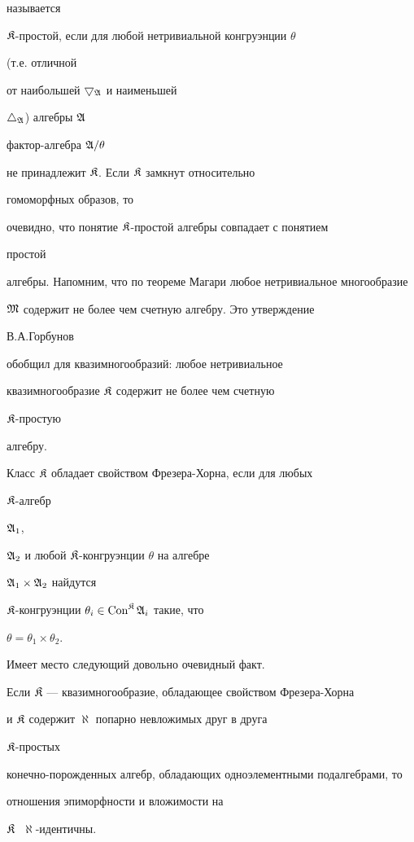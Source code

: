 называется


$\frak K$-простой, если для любой нетривиальной конгруэнции $\theta$


(т.е. отличной


от наибольшей $\bigtriangledown_{\frak A}$ и наименьшей


$\bigtriangleup_{\frak A}$) алгебры $\frak A$


фактор-алгебра $\frak A/\theta$


не принадлежит $\frak K$. Если $\frak K$ замкнут относительно


гомоморфных образов, то


очевидно, что понятие $\frak K$-простой алгебры совпадает с понятием


простой


алгебры. Напомним, что по теореме Магари любое нетривиальное многообразие


$\frak M$ содержит не более чем счетную алгебру. Это утверждение


В.А.Горбунов


\cite{Gor} обобщил для квазимногообразий: любое нетривиальное


квазимногообразие $\frak K$ содержит не более чем счетную


$\frak K$-простую


алгебру.





Класс $\frak K$ обладает свойством Фрезера-Хорна, если для любых


$\frak K$-алгебр


$\frak A_1$,


$\frak A_2$ и любой $\frak K$-конгруэнции $\theta$ на алгебре


$\frak A_1\times\frak A_2$ найдутся


$\frak K$-конгруэнции $\theta_i\in\operatorname{Con}^{\frak K}\frak A_i$ такие, что


$\theta=\theta_1\times\theta_2$.





Имеет место следующий довольно очевидный факт.





\begin{thm}


Если $\frak K$ --- квазимногообразие, обладающее свойством Фрезера-Хорна


и $\frak K$ содержит $\aleph$ попарно невложимых друг в друга


$\frak K$-простых


конечно-порожденных алгебр, обладающих одноэлементными подалгебрами, то


отношения эпиморфности и вложимости на


$\frak K\;$ $\aleph$-идентичны.


\end{thm}





